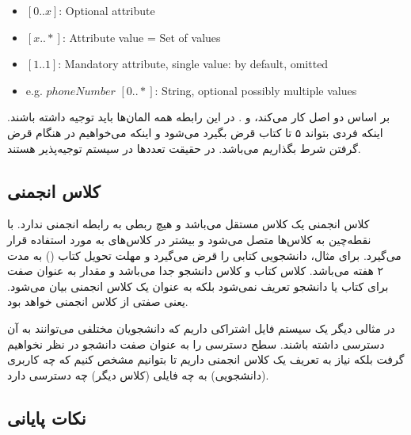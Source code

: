 \begin{LTR}
    \begin{itemize}
        \item $[0..x]$: Optional attribute
        \item $[x..*]$: Attribute value = Set of values
        \item $[1..1]$: Mandatory attribute, single value: by default, omitted
        \item e.g. $phoneNumber$ $[0..*]$: String, optional possibly multiple
        values
    \end{itemize}
\end{LTR}

بر اساس دو اصل کار می‌کند،  و . در این رابطه
همه المان‌ها باید توجیه داشته باشند. اینکه فردی بتواند ۵ تا کتاب قرض بگیرد
می‌شود  و اینکه می‌خواهیم در هنگام قرض گرفتن شرط بگذاریم
 می‌باشد. در حقیقت تعدد‌ها در سیستم توجیه‌پذیر هستند.

\subsection{کلاس انجمنی}

کلاس انجمنی یک کلاس مستقل می‌باشد و هیچ ربطی به رابطه انجمنی ندارد. با نقطه‌چین
به کلاس‌ها متصل می‌شود و بیشتر در کلاس‌های  به  مورد استفاده قرار
می‌گیرد. برای مثال، دانشجویی کتابی را قرض می‌گیرد و مهلت تحویل کتاب () به مدت ۲ هفته می‌باشد. کلاس کتاب و کلاس دانشجو جدا می‌باشد و مقدار
 به عنوان صفت برای کتاب یا دانشجو تعریف نمی‌شود بلکه به عنوان
یک کلاس انجمنی بیان می‌شود. یعنی صفتی از کلاس انجمنی خواهد بود.

در مثالی دیگر یک سیستم فایل اشتراکی داریم که دانشجویان مختلفی می‌توانند به آن
دسترسی داشته باشند. سطح دسترسی را به عنوان صفت دانشجو در نظر نخواهیم گرفت بلکه
نیاز به تعریف یک کلاس انجمنی داریم تا بتوانیم مشخص کنیم که چه کاربری (دانشجویی)
به چه فایلی (کلاس دیگر) چه دسترسی دارد.

\begin{LTR}


\end{LTR}

\subsection{نکات پایانی}

